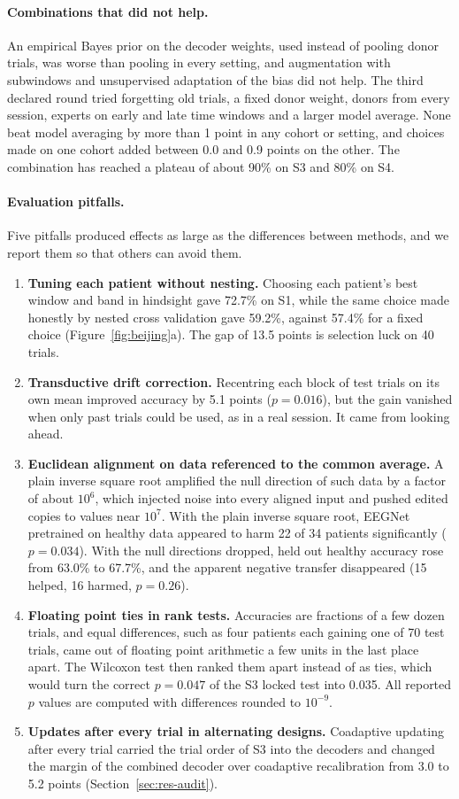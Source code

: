\documentclass[pdflatex,sn-mathphys-num]{sn-jnl}
\begin{document}
\paragraph{Combinations that did not help.} An empirical Bayes prior on the decoder weights, used instead of pooling donor trials, was worse than pooling in every setting, and augmentation with subwindows and unsupervised adaptation of the bias did not help. The third declared round tried forgetting old trials, a fixed donor weight, donors from every session, experts on early and late time windows and a larger model average. None beat model averaging by more than 1 point in any cohort or setting, and choices made on one cohort added between 0.0 and 0.9 points on the other. The combination has reached a plateau of about 90\% on S3 and 80\% on S4.

\paragraph{Evaluation pitfalls.} Five pitfalls produced effects as large as the differences between methods, and we report them so that others can avoid them.
\begin{enumerate}
\item \textbf{Tuning each patient without nesting.} Choosing each patient's best window and band in hindsight gave 72.7\% on S1, while the same choice made honestly by nested cross validation gave 59.2\%, against 57.4\% for a fixed choice (Figure~\ref{fig:beijing}a). The gap of 13.5 points is selection luck on 40 trials.
\item \textbf{Transductive drift correction.} Recentring each block of test trials on its own mean improved accuracy by 5.1 points ($p = 0.016$), but the gain vanished when only past trials could be used, as in a real session. It came from looking ahead.
\item \textbf{Euclidean alignment on data referenced to the common average.} A plain inverse square root amplified the null direction of such data by a factor of about $10^6$, which injected noise into every aligned input and pushed edited copies to values near $10^7$. With the plain inverse square root, EEGNet pretrained on healthy data appeared to harm 22 of 34 patients significantly ($p = 0.034$). With the null directions dropped, held out healthy accuracy rose from 63.0\% to 67.7\%, and the apparent negative transfer disappeared (15 helped, 16 harmed, $p = 0.26$).
\item \textbf{Floating point ties in rank tests.} Accuracies are fractions of a few dozen trials, and equal differences, such as four patients each gaining one of 70 test trials, came out of floating point arithmetic a few units in the last place apart. The Wilcoxon test then ranked them apart instead of as ties, which would turn the correct $p = 0.047$ of the S3 locked test into 0.035. All reported $p$ values are computed with differences rounded to $10^{-9}$.
\item \textbf{Updates after every trial in alternating designs.} Coadaptive updating after every trial carried the trial order of S3 into the decoders and changed the margin of the combined decoder over coadaptive recalibration from 3.0 to 5.2 points (Section~\ref{sec:res-audit}).
\end{enumerate}
\end{document}
